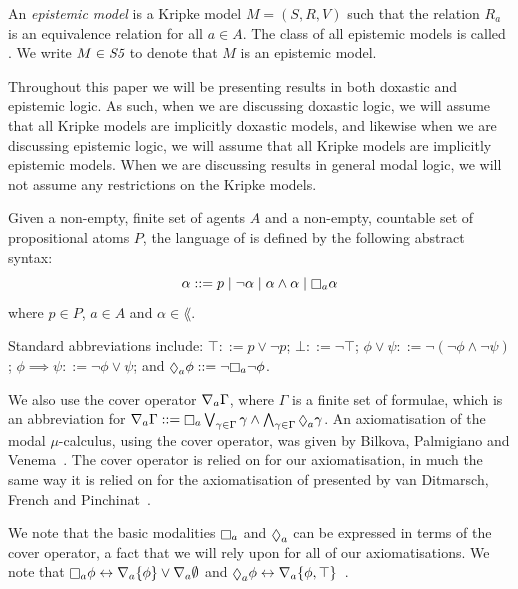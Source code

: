 \begin{definition}
An \textit{epistemic model} is a Kripke model $M = (S, R, V)$ such that the
relation $R_a$ is an equivalence relation for all $a \in A$. The class of all
epistemic models is called \classS{}. We write $M \in \textit{S5}{}$ to denote that
$M$ is an epistemic model.
\end{definition}

Throughout this paper we will be presenting results in both doxastic and
epistemic logic.  As such, when we are discussing doxastic logic, we will
assume that all Kripke models are implicitly doxastic models, and likewise when
we are discussing epistemic logic, we will assume that all Kripke models are
implicitly epistemic models. When we are discussing results in general modal
logic, we will not assume any restrictions on the Kripke models.

\begin{definition}
Given a non-empty, finite set of agents $A$ and a non-empty, countable set of
propositional atoms $P$, the language of \lang{} is defined by the following
abstract syntax:
$$
\alpha ::=  p \bnfalt
            \neg \alpha \bnfalt
            \alpha \land \alpha \bnfalt
            \knows_a \alpha
$$
where $p \in P$, $a \in A$ and $\alpha \in \lang{}$.
\end{definition}

Standard abbreviations include:
$\top ::= p \lor \neg p$;
$\bot ::= \neg \top$;
$\phi \lor \psi ::= \neg (\neg \phi \land \neg \psi)$;
$\phi \implies \psi ::= \neg \phi \lor \psi$;
and $\suspects_a \phi ::= \neg \knows_a \neg \phi$.

We also use the cover operator $\nabla_a \Gamma$, where $\Gamma$ is a finite
set of formulae, which is an abbreviation for $\covers_a \Gamma ::= \knows_a
\bigvee_{\gamma \in \Gamma} \gamma \land \bigwedge_{\gamma \in \Gamma}
\suspects_a \gamma$. An axiomatisation of the modal $\mu$-calculus, using the
cover operator, was given by Bilkova, Palmigiano and
Venema~\cite{bilkova2008proof}. The cover operator is relied on for our
axiomatisation, in much the same way it is relied on for the axiomatisation of
\logicKiF{} presented by van Ditmarsch, French and
Pinchinat~\cite{french2010future}.

We note that the basic modalities $\knows_a$ and $\suspects_a$ can be expressed
in terms of the cover operator, a fact that we will rely upon for all of our
axiomatisations. We note that $\knows_a \phi \iff \covers_a \{\phi\} \lor
\covers_a \emptyset$ and $\suspects_a \phi \iff \covers_a \{\phi,
\top\}$~\cite{bilkova2008proof}. 

